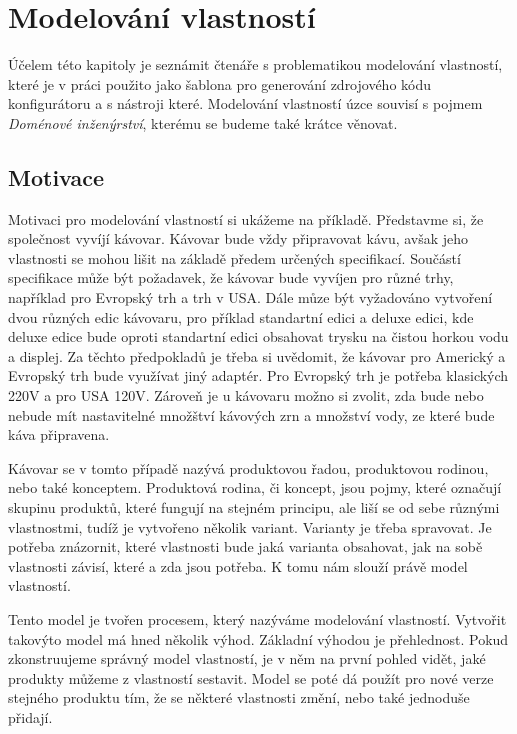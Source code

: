\chapter{Modelování vlastností}

Účelem této kapitoly je seznámit čtenáře s problematikou modelování vlastností, které je v práci použito jako šablona pro generování zdrojového kódu konfigurátoru a s nástroji které. Modelování vlastností úzce souvisí s pojmem \textit{Doménové inženýrství}, kterému se budeme také krátce věnovat.

\section{Motivace}

Motivaci pro modelování vlastností si ukážeme na příkladě. Představme si, že společnost vyvíjí kávovar. Kávovar bude vždy připravovat kávu, avšak jeho vlastnosti se mohou lišit na základě předem určených specifikací. Součástí specifikace může být požadavek, že kávovar bude vyvíjen pro různé trhy, například pro Evropský trh a trh v USA. Dále můze být vyžadováno vytvoření dvou různých edic kávovaru, pro příklad standartní edici a deluxe edici, kde deluxe edice bude oproti standartní edici obsahovat trysku na čistou horkou vodu a displej. Za těchto předpokladů je třeba si uvědomit, že kávovar pro Americký a Evropský trh bude využívat jiný adaptér. Pro Evropský trh je potřeba klasických 220V a pro USA 120V. Zároveň je u kávovaru možno si zvolit, zda bude nebo nebude mít nastavitelné množštví kávových zrn a množství vody, ze které bude káva připravena.

Kávovar se v tomto případě nazývá produktovou řadou, produktovou rodinou, nebo také konceptem. Produktová rodina, či koncept, jsou pojmy, které označují skupinu produktů, které fungují na stejném principu, ale liší se od sebe různými vlastnostmi, tudíž je vytvořeno několik variant. Varianty je třeba spravovat. Je potřeba znázornit, které vlastnosti bude jaká varianta obsahovat, jak na sobě vlastnosti závisí, které a zda jsou potřeba. K tomu nám slouží právě model vlastností.

Tento model je tvořen procesem, který nazýváme modelování vlastností. Vytvořit takovýto model má hned několik výhod. Základní výhodou je přehlednost. Pokud zkonstruujeme správný model vlastností, je v něm na první pohled vidět, jaké produkty můžeme z vlastností sestavit. Model se poté dá použít pro nové verze stejného produktu tím, že se některé vlastnosti změní, nebo také jednoduše přidají.

